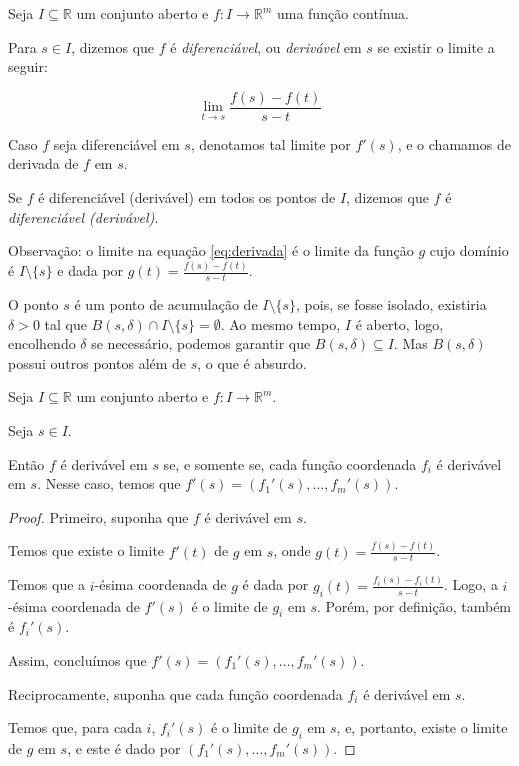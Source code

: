 \begin{definition}
    Seja $I\subseteq \mathbb R$ um conjunto aberto e $f: I\rightarrow \mathbb R^m$ uma função contínua.

    Para $s \in I$, dizemos que $f$ é \emph{diferenciável}, ou \emph{derivável} em $s$ se existir o limite a seguir:

    \begin{equation}\label{eq:derivada}
        \lim_{t \to s} \frac{f(s)-f(t)}{s-t}
    \end{equation}

    Caso $f$ seja diferenciável em $s$, denotamos tal limite por $f'(s)$, e o chamamos de derivada de $f$ em $s$.

    Se $f$ é diferenciável (derivável) em todos os pontos de $I$, dizemos que $f$ é \emph{diferenciável (derivável)}.
\end{definition}

Observação: o limite na equação \eqref{eq:derivada} é o limite da função $g$ cujo domínio é $I\setminus \{s\}$ e dada por $g(t) = \frac{f(s)-f(t)}{s-t}$.

O ponto $s$ é um ponto de acumulação de $I\setminus\{s\}$, pois, se fosse isolado, existiria $\delta>0$ tal que $B(s, \delta)\cap I\setminus\{s\}=\emptyset$.
Ao mesmo tempo, $I$ é aberto, logo, encolhendo $\delta$ se necessário, podemos garantir que $B(s, \delta)\subseteq I$.
Mas $B(s, \delta)$ possui outros pontos além de $s$, o que é absurdo.

\begin{proposition}
    Seja $I\subseteq \mathbb R$ um conjunto aberto e $f: I\rightarrow \mathbb R^m$.

    Seja $s \in I$.
    
    Então $f$ é derivável em $s$ se, e somente se, cada função coordenada $f_i$ é derivável em $s$.
    Nesse caso, temos que $f'(s) = (f_1'(s), \dots, f_m'(s))$.
\end{proposition}
\begin{proof}
    Primeiro, suponha que $f$ é derivável em $s$.

    Temos que existe o limite $f'(t)$ de $g$ em $s$, onde $g(t) = \frac{f(s)-f(t)}{s-t}$.

    Temos que a $i$-ésima coordenada de $g$ é dada por $g_i(t) = \frac{f_i(s)-f_i(t)}{s-t}$.
    Logo, a $i$-ésima coordenada de $f'(s)$ é o limite de $g_i$ em $s$. Porém, por definição, também é $f_i'(s)$.

    Assim, concluímos que $f'(s) = (f_1'(s), \dots, f_m'(s))$.

    Reciprocamente, suponha que cada função coordenada $f_i$ é derivável em $s$.

    Temos que, para cada $i$, $f_i'(s)$ é o limite de $g_i$ em $s$, e, portanto, existe o limite de $g$ em $s$, e este é dado por $(f_1'(s), \dots, f_m'(s))$.
\end{proof}

